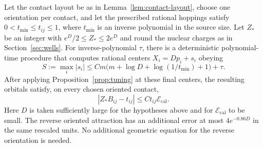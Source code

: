 \begin{proposition}
\label{prop:calibration}
Let the contact layout be as in Lemma~\ref{lem:contact-layout},
choose one orientation per contact, and let the prescribed rational
hoppings satisfy $0<t_{\min}\le t_{ij}\le1$, where $t_{\min}$ is
an inverse polynomial in the source size.  Let $Z_*$ be an integer
with $e^D/2\le Z_*\le2e^D$ and round the nuclear charges as in
Section~\ref{sec:wells}.  For inverse-polynomial $\tau$, there is
a deterministic polynomial-time procedure that computes rational
centers $X_i=Dp_i+s_i$ obeying
\begin{equation}
 S:=\max_i|s_i|
   \le Cm\bigl(m+\log D+\log(1/t_{\min})+1\bigr)+\tau.
 \label{eq:calibrated-displacement-size}
\end{equation}
After applying Proposition~\ref{prop:tuning} at these final centers,
the resulting orbitals satisfy, on every chosen oriented contact,
\begin{equation}
 |Z_*B_{ij}-t_{ij}|
      \le C t_{ij}\mathcal E_{\mathrm{cal}}.
 \label{eq:calibrated-contact-error}
\end{equation}
Here $D$ is taken sufficiently large for the hypotheses above and
for $\mathcal E_{\mathrm{cal}}$ to be small.  The reverse oriented
attraction has an additional error at most $4e^{-0.86D}$ in the
same rescaled units.  No additional geometric equation for the
reverse orientation is needed.
\end{proposition}

